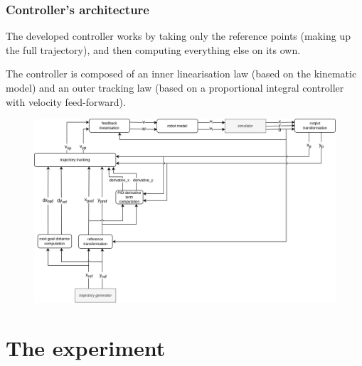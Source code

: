 \documentclass{beamer}
\begin{document}
\begin{frame}[allowframebreaks]
\frametitle{Controller's architecture}

The developed controller works by taking only the reference points (making up
the full trajectory), and then computing everything else on its own.

\vspace{2em}

The controller is composed of an inner linearisation law (based on the kinematic
model) and an outer tracking law (based on a proportional integral controller
with velocity feed-forward).

\framebreak

\begin{figure}[H]
    \centering
    \includegraphics[scale=0.12]{img/other/custom_controller.png}
\end{figure}

\end{frame}




\section{The experiment}

\end{document}
